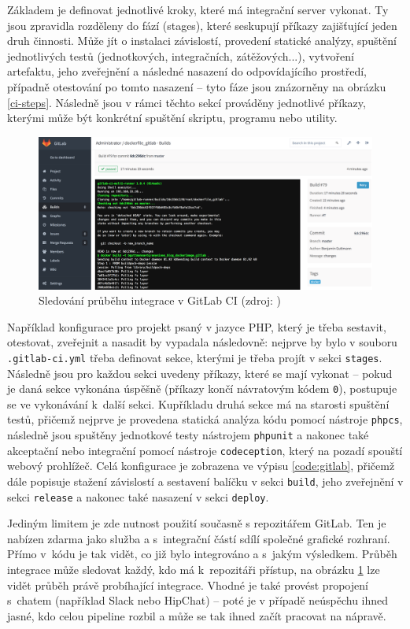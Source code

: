 \documentclass[FM,DP]{tulthesis}
\begin{document}
Základem je definovat jednotlivé kroky, které má integrační server vykonat. Ty jsou zpravidla rozděleny do fází
(stages), které seskupují příkazy zajišťující jeden druh činnosti. Může jít o instalaci závislostí, 
provedení statické analýzy, spuštění jednotlivých testů (jednotkových, integračních, zátěžových...), vytvoření
artefaktu, jeho zveřejnění a následné nasazení do odpovídajícího prostředí, případně otestování po tomto nasazení --
tyto fáze jsou znázorněny na obrázku \ref{ci-steps}. Následně jsou v rámci těchto sekcí prováděny jednotlivé
příkazy, kterými může být konkrétní spuštění skriptu, programu nebo utility.

\begin{figure}[h]
\center
\includegraphics[width=\textwidth]{gitlab.png}
\caption{Sledování průběhu integrace v GitLab CI (zdroj: \cite{gitlab})}
\label{gitlab}
\end{figure}

Například konfigurace pro projekt psaný v jazyce PHP, který je třeba sestavit, otestovat, zveřejnit a nasadit
by vypadala následovně: nejprve by bylo v souboru \verb|.gitlab-ci.yml| třeba definovat sekce, kterými je třeba
projít v sekci \verb|stages|. Následně jsou pro každou sekci uvedeny příkazy, které se mají vykonat -- pokud je
daná sekce vykonána úspěšně (příkazy končí návratovým kódem \verb|0|), postupuje se ve vykonávání k~další sekci.
Kupříkladu druhá sekce má na starosti spuštění testů, přičemž nejprve je provedena statická analýza kódu pomocí
nástroje \verb|phpcs|, následně jsou spuštěny jednotkové testy nástrojem \verb|phpunit| a nakonec také akceptační
nebo integrační pomocí nástroje \verb|codeception|, který na pozadí spouští webový prohlížeč. Celá konfigurace
je zobrazena ve výpisu \ref{code:gitlab}, přičemž dále popisuje stažení závislostí a sestavení balíčku v sekci 
\verb|build|, jeho zveřejnění v sekci \verb|release| a nakonec také nasazení v sekci \verb|deploy|.

Jediným limitem je zde nutnost použití současně s repozitářem GitLab. Ten je nabízen zdarma jako služba
a s~integrační částí sdílí společné grafické rozhraní. Přímo v~kódu je tak vidět, co již bylo
integrováno a s~jakým výsledkem. Průběh integrace může sledovat každý, kdo má k~repozitáři přístup, 
na obrázku \ref{gitlab} lze vidět průběh právě probíhající integrace. Vhodné je také provést propojení
s~chatem (například Slack nebo HipChat) -- poté je v případě neúspěchu ihned jasné, kdo celou
pipeline rozbil a může se tak ihned začít pracovat na nápravě. 
\end{document}
